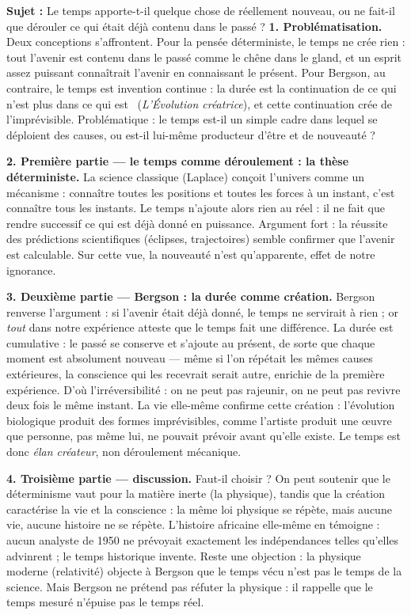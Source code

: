\documentclass[11pt]{article}
\begin{document}
\begin{exoresolu}
\textbf{Sujet :} Le temps apporte-t-il quelque chose de réellement nouveau, ou ne fait-il que dérouler ce qui était déjà contenu dans le passé ?
\tcblower
\textbf{1. Problématisation.} Deux conceptions s'affrontent. Pour la pensée déterministe, le temps ne crée rien : tout l'avenir est contenu dans le passé comme le chêne dans le gland, et un esprit assez puissant connaîtrait l'avenir en connaissant le présent. Pour Bergson, au contraire, le temps est invention continue : \guillemotleft la durée est la continuation de ce qui n'est plus dans ce qui est \guillemotright\ (\emph{L'Évolution créatrice}), et cette continuation crée de l'imprévisible. Problématique : le temps est-il un simple cadre dans lequel se déploient des causes, ou est-il lui-même producteur d'être et de nouveauté ?

\textbf{2. Première partie --- le temps comme déroulement : la thèse déterministe.} La science classique (Laplace) conçoit l'univers comme un mécanisme : connaître toutes les positions et toutes les forces à un instant, c'est connaître tous les instants. Le temps n'ajoute alors rien au réel : il ne fait que rendre successif ce qui est déjà donné en puissance. Argument fort : la réussite des prédictions scientifiques (éclipses, trajectoires) semble confirmer que l'avenir est calculable. Sur cette vue, la nouveauté n'est qu'apparente, effet de notre ignorance.

\textbf{3. Deuxième partie --- Bergson : la durée comme création.} Bergson renverse l'argument : si l'avenir était déjà donné, le temps ne servirait à rien ; or \emph{tout} dans notre expérience atteste que le temps fait une différence. La durée est cumulative : le passé se conserve et s'ajoute au présent, de sorte que chaque moment est absolument nouveau --- même si l'on répétait les mêmes causes extérieures, la conscience qui les recevrait serait autre, enrichie de la première expérience. D'où l'irréversibilité : on ne peut pas rajeunir, on ne peut pas revivre deux fois le même instant. La vie elle-même confirme cette création : l'évolution biologique produit des formes imprévisibles, comme l'artiste produit une œuvre que personne, pas même lui, ne pouvait prévoir avant qu'elle existe. Le temps est donc \emph{élan créateur}, non déroulement mécanique.

\textbf{4. Troisième partie --- discussion.} Faut-il choisir ? On peut soutenir que le déterminisme vaut pour la matière inerte (la physique), tandis que la création caractérise la vie et la conscience : la même loi physique se répète, mais aucune vie, aucune histoire ne se répète. L'histoire africaine elle-même en témoigne : aucun analyste de 1950 ne prévoyait exactement les indépendances telles qu'elles advinrent ; le temps historique invente. Reste une objection : la physique moderne (relativité) objecte à Bergson que le temps vécu n'est pas le temps de la science. Mais Bergson ne prétend pas réfuter la physique : il rappelle que le temps mesuré n'épuise pas le temps réel.


\end{exoresolu}
\end{document}
